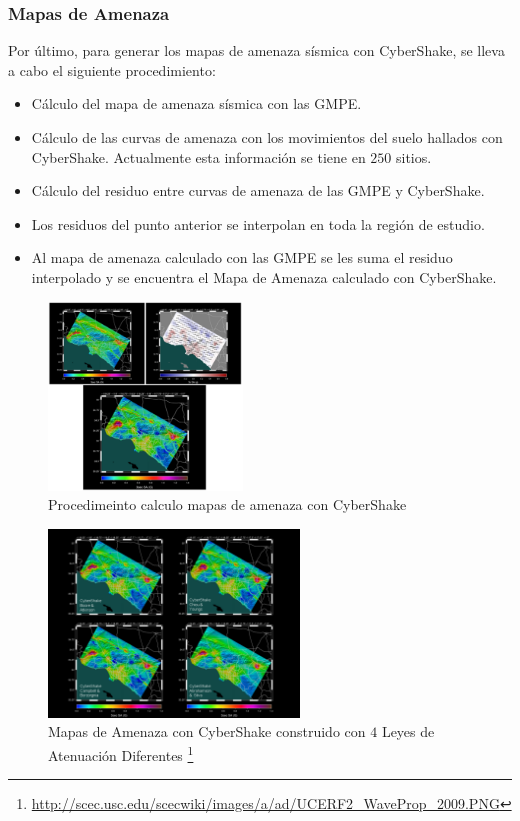 \begin{frame}[allowframebreaks]
\frametitle{Mapas de Amenaza}
%
\justifying
%
Por último, para generar los mapas de amenaza sísmica con CyberShake, se lleva a cabo el siguiente procedimiento:
%
\begin{itemize}
%
	\item Cálculo del mapa de amenaza sísmica con las GMPE.
	\item Cálculo de las curvas de amenaza con los movimientos del suelo hallados con CyberShake. Actualmente esta información se tiene en $250$ sitios.
	\item Cálculo del residuo entre curvas de amenaza de las GMPE y CyberShake.
	\item Los residuos del punto anterior se interpolan en toda la región de estudio.
	\item Al mapa de amenaza calculado con las GMPE se les suma el residuo interpolado y se encuentra el Mapa de Amenaza calculado con CyberShake. 
%
\end{itemize}
%
\begin{figure}[h]
	\centering
	\includegraphics[height=5cm]{img/ProcesoMapaAmenaza.pdf}
	\caption{Procedimeinto calculo mapas de amenaza con CyberShake \cite[figura 9, página 12]{gravesetal}}
	\vspace{-.5 cm}
\end{figure}
%
\begin{figure}[h]
	\centering
	\includegraphics[height=5cm]{img/MapaAmenaza.pdf}
	\caption{Mapas de Amenaza con CyberShake construido con $4$ Leyes de Atenuación Diferentes \footnote{\tiny \url{http://scec.usc.edu/scecwiki/images/a/ad/UCERF2_WaveProp_2009.PNG}}}
	\vspace{-.5 cm}
\end{figure}
%
%
\end{frame}
